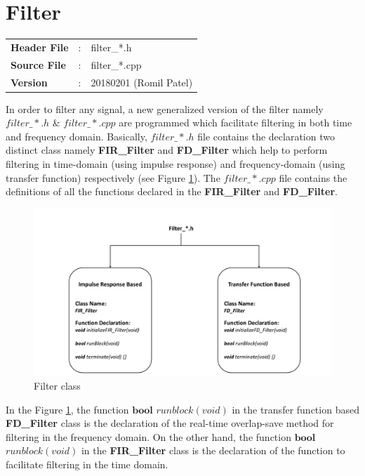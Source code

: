 \section{Filter}
\begin{tcolorbox}	
	\begin{tabular}{p{2.75cm} p{0.2cm} p{10.5cm}}
		\textbf{Header File}   &:& filter\_*.h \\
		\textbf{Source File}   &:& filter\_*.cpp \\
		\textbf{Version}       &:& 20180201 (Romil Patel)
	\end{tabular}
\end{tcolorbox}
In order to filter any signal, a new generalized version of the filter namely $filter\_*.h$ \& $filter\_*.cpp$ are programmed which facilitate filtering in both time and frequency domain. Basically, $filter\_*.h$ file contains the declaration two distinct class namely \textbf{FIR\_Filter} and \textbf{FD\_Filter} which help to perform filtering in time-domain (using impulse response) and frequency-domain (using transfer function) respectively (see Figure \ref{FilterClass}). The $filter\_*.cpp$ file contains the definitions of all the functions declared in the  \textbf{FIR\_Filter} and \textbf{FD\_Filter}.\\
\begin{figure}[h]
	\centering
	\includegraphics[width=16cm]{./algorithms/filter/figures/Filter_class.pdf}
	\caption{Filter class}
	\label{FilterClass}
\end{figure}
In the Figure \ref{FilterClass}, the function $\textbf{bool}$ $runblock(void)$ in the transfer function based \textbf{FD\_Filter} class is the declaration of the real-time overlap-save method for filtering in the frequency domain. On the other hand, the function  $\textbf{bool}$ $runblock(void)$ in the \textbf{FIR\_Filter} class is the declaration of the function to facilitate filtering in the time domain.\\
